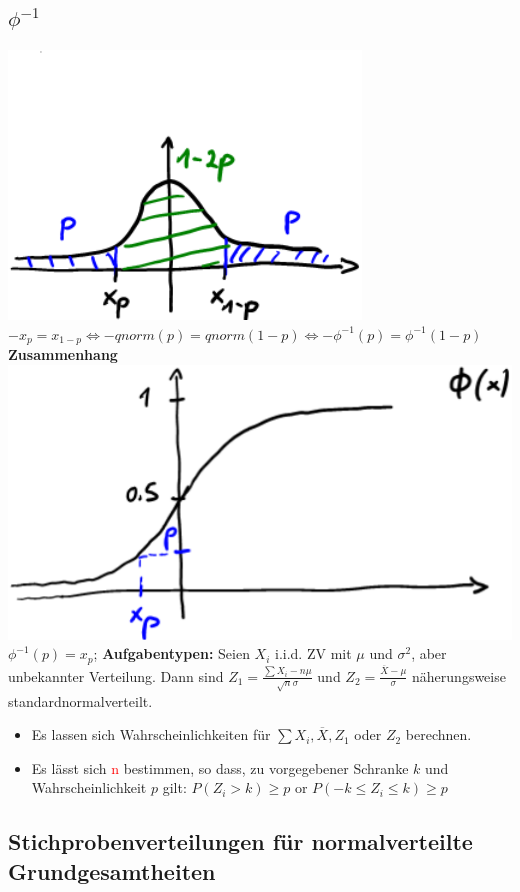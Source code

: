 \subsection{$\phi^{-1}$}
\includegraphics[scale=0.25]{./pic/ZGWPhi-1Verteilung.png}
$  -x_{p} = x_{1-p} \Leftrightarrow -qnorm(p) = qnorm(1-p) \Leftrightarrow -\phi^{-1}(p) = \phi^{-1}(1-p) $
\textbf{Zusammenhang}
\includegraphics[scale=0.25]{./pic/ZGWSigmoidFunction.png} $ \phi^{-1}(p) = x_{p} $; 
\textbf{Aufgabentypen:} 
Seien $ X_{i} $ i.i.d. ZV mit $\mu$ und $ \sigma^2 $, aber unbekannter Verteilung. Dann sind $ Z_{1} = \frac{\sum X_{i}-n\mu}{\sqrt{n}\sigma}$ und $Z_{2} = \frac{\overline{X}-\mu}{\sigma} $  näherungsweise standardnormalverteilt.
\begin{itemize}
	\item Es lassen sich Wahrscheinlichkeiten für $\sum X_{i}, \overline{X}, Z_{1}$ oder $ Z_{2} $ berechnen.
	\item Es lässt sich \textcolor{red}{n} bestimmen, so dass, zu vorgegebener Schranke $ k $ und Wahrscheinlichkeit $ p $ gilt: $ P(Z_{i} > k) \geq p $ or $ P(-k \leq Z_{i} \leq k) \geq p $
\end{itemize}
\subsection{Stichprobenverteilungen für normalverteilte Grundgesamtheiten}
